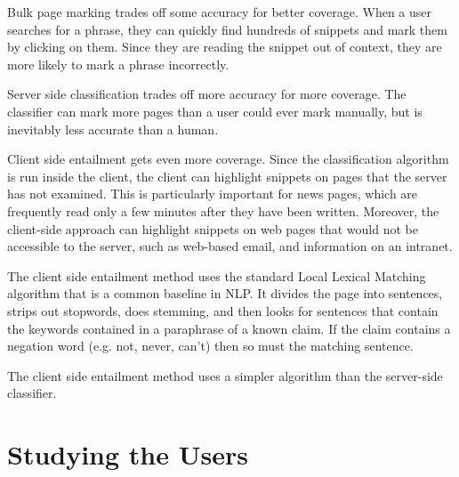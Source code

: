 \documentclass{www2010-submission}
\newcommand{\todo}[1]{}
\begin{document}
Bulk page marking trades off some accuracy for better coverage. When a user searches for a phrase, they can quickly find hundreds of snippets and mark them by clicking on them. Since they are reading the snippet out of context, they are more likely to mark a phrase incorrectly. 

Server side classification trades off more accuracy for more coverage. The classifier can mark more pages than a user could ever mark manually, but is inevitably less accurate than a human.

Client side entailment gets even more coverage. Since the classification algorithm is run inside the client, the client can highlight snippets on pages that the server has not examined. This is particularly important for news pages, which are frequently read only a few minutes after they have been written. Moreover, the client-side approach can highlight snippets on web pages that would not be accessible to the server, such as web-based email, and information on an intranet.

The client side entailment method uses the standard Local Lexical Matching algorithm that is a common baseline in NLP. It divides the page into sentences, strips out stopwords, does stemming, and then looks for sentences that contain the keywords contained in a paraphrase of a known claim. If the claim contains a negation word (e.g. not, never, can't) then so must the matching sentence.

\todo{Discuss how and why this is simpler than the server-side classification method}
\todo{Explain how we avoid downloading the entire database}


The client side entailment method uses a simpler algorithm than the server-side classifier. 



\todo{Should we have a version where the interface merely suggests n-grams that should be used by the classifier}
\todo{Can we present all these systems without giving detailed stats about how they compare?}
\todo{Add support for a user to enter 'anti-phrases' when a snippet is wrongly highlighted}
\todo{Add support for a user to enter a paraphrase that will match the snippet they are looking at}
\todo{Do a load more people in a final user-study round. Try to get it up to 8.}
\todo{Explain how our algorithm relates to existing NLP work - due to unusual domain}


\section{Studying the Users}
\end{document}
